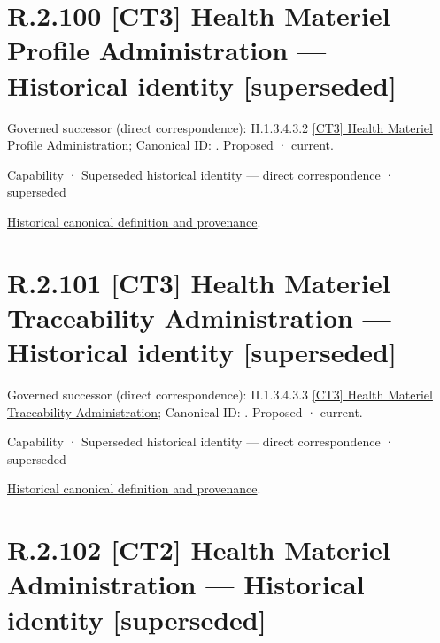 \section*{R.2.100 [CT3] Health Materiel Profile Administration — Historical identity [superseded]}
\label{navigation:R.2.100}

{\small Governed successor (direct correspondence): II.1.3.4.3.2 \hyperref[element:9626edae517d40d2bfae619860f18e20]{[CT3] Health Materiel Profile Administration}; Canonical ID: \texttt{}. Proposed · current.}\par
\label{element:9216f9cc905e4526b1d98cd4ab382cbf}
{\small Capability · Superseded historical identity — direct correspondence · superseded}\par
\href{../../../../continuum/strategy/capability/9216f9cc905e4526b1d98cd4ab382cbf.md}{Historical canonical definition and provenance}.\par
\section*{R.2.101 [CT3] Health Materiel Traceability Administration — Historical identity [superseded]}
\label{navigation:R.2.101}

{\small Governed successor (direct correspondence): II.1.3.4.3.3 \hyperref[element:2d41ed0f00a94a4b90ffe87d6fd4e9fe]{[CT3] Health Materiel Traceability Administration}; Canonical ID: \texttt{}. Proposed · current.}\par
\label{element:f1b888e8d50c4019ac1afe162d6223f3}
{\small Capability · Superseded historical identity — direct correspondence · superseded}\par
\href{../../../../continuum/strategy/capability/f1b888e8d50c4019ac1afe162d6223f3.md}{Historical canonical definition and provenance}.\par
\section*{R.2.102 [CT2] Health Materiel Administration — Historical identity [superseded]}
\label{navigation:R.2.102}

